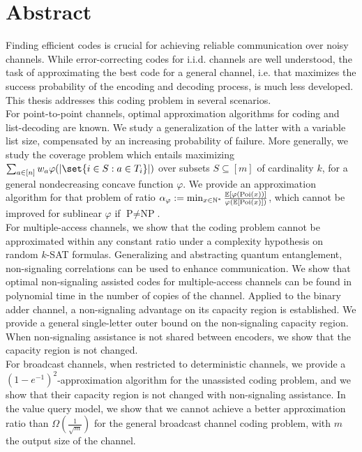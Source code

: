\chapter*{Abstract}
Finding efficient codes is crucial for achieving reliable communication over noisy channels. While error-correcting codes for i.i.d. channels are well understood, the task of approximating the best code for a general channel, i.e. that maximizes the success probability of the encoding and decoding process, is much less developed. This thesis addresses this coding problem in several scenarios.\vspace{2mm}\\
For point-to-point channels, optimal approximation algorithms for coding and list-decoding are known. We study a generalization of the latter with a variable list size, compensated by an increasing probability of failure. More generally, we study the coverage problem which entails maximizing $\sum_{a \in [n]} w_a \varphi(\abs{\set{i \in S : a \in T_i}})$ over subsets $S \subseteq [m]$ of cardinality $k$, for a general nondecreasing concave function $\varphi$. We provide an approximation algorithm for that problem of ratio $\alpha_{\varphi} := \min_{x \in \mathbb{N}^*} \frac{\mathbb{E}[\varphi(\operatorname{\text{Poi}}(x))]}{\varphi(\mathbb{E}[\operatorname{\text{Poi}}(x)])}$, which cannot be improved for sublinear $\varphi$ if $\textrm{P}\not=\textrm{NP}$.\vspace{2mm}\\
For multiple-access channels, we show that the coding problem cannot be approximated within any constant ratio under a complexity hypothesis on random $k$-SAT formulas. Generalizing and abstracting quantum entanglement, non-signaling correlations can be used to enhance communication. We show that optimal non-signaling assisted codes for multiple-access channels can be found in polynomial time in the number of copies of the channel. Applied to the binary adder channel, a non-signaling advantage on its capacity region is established. We provide a general single-letter outer bound on the non-signaling capacity region. When non-signaling assistance is not shared between encoders, we show that the capacity region is not changed.\vspace{2mm}\\
For broadcast channels, when restricted to deterministic channels, we provide a $(1-e^{-1})^2$-approximation algorithm for the unassisted coding problem, and we show that their capacity region is not changed with non-signaling assistance. In the value query model, we show that we cannot achieve a better approximation ratio than $\Omega\left(\frac{1}{\sqrt{m}}\right)$ for the general broadcast channel coding problem, with $m$ the output size of the channel.

